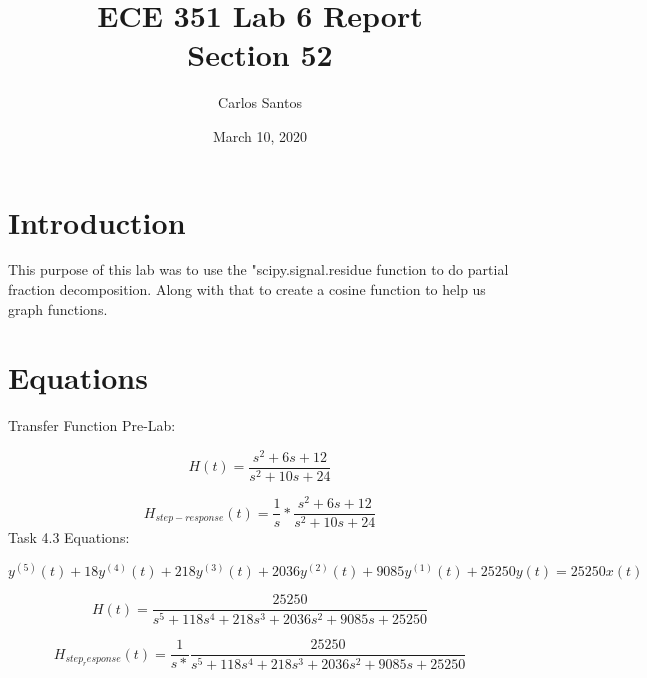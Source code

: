 \documentclass[12pt]{article}
\title{ECE 351 Lab 6 Report \\ Section 52}
\date{March 10, 2020}
\author{Carlos Santos}
\begin{document}
\vspace{\fill}
\maketitle
\vspace{\fill}
\clearpage

\section*{Introduction}

This purpose of this lab was to use the "scipy.signal.residue function to do partial fraction decomposition.
Along with that to create a cosine function to help us graph functions.

\section*{Equations}

Transfer Function Pre-Lab:

\begin{equation}
   H(t) =  \frac{s^2 + 6s + 12}{ s^2 + 10s + 24}
\end{equation}

\begin{equation}
    H_{step-response}(t) = \frac{1}{s} * \frac{s^2 + 6s + 12}{ s^2 + 10s + 24}
\end{equation}
Task 4.3 Equations:

\begin{equation}
    y^{(5)}(t) + 18y^{(4)}(t) + 218y^{(3)}(t) + 2036y^{(2)}(t) + 9085y^{(1)}(t) + 25250y(t) = 25250 x(t)
\end{equation}

\begin{equation}
    H(t) = \frac{25250}{s^5 + 118s^4 + 218s^3 + 2036s^2 + 9085s + 25250}
\end{equation}

\begin{equation}
    H_{step_response}(t) = \frac{1}{s * }\frac{25250}{s^5 + 118s^4 + 218s^3 + 2036s^2 + 9085s + 25250}
\end{equation}

\end{document}
